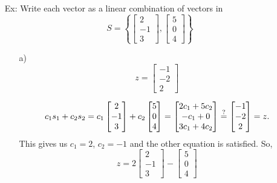 \documentclass[reqno]{amsart}
\theoremstyle{definition}
\begin{document}
\begin{enumerate}

\item[Ex:  ]  Write each vector as a linear combination of vectors in
%
\begin{equation*}
S = \left\lbrace\begin{bmatrix}
2\\
-1\\
3
\end{bmatrix}, \begin{bmatrix}
5\\
0\\
4
\end{bmatrix}\right\rbrace
\end{equation*}

\begin{enumerate}

\item[a)]
%
\begin{equation*}
z = \begin{bmatrix}
-1\\
-2\\
2
\end{bmatrix}
\end{equation*}

\begin{equation*}
c_1s_1 + c_2s_2 = 
c_1\begin{bmatrix}
2\\
-1\\
3
\end{bmatrix} + c_2\begin{bmatrix}
5\\
0\\
4
\end{bmatrix} = \begin{bmatrix}
2c_1 + 5c_2\\
-c_1 + 0\\
3c_1 + 4c_2
\end{bmatrix} \stackrel{?}{=} \begin{bmatrix}
-1\\
-2\\
2
\end{bmatrix} = z.
\end{equation*}
%
This gives us $c_1 = 2$, $c_2 = -1$ and the other equation is satisfied.  So,
%
\begin{equation*}
z = 2\begin{bmatrix}
2\\
-1\\
3
\end{bmatrix} - \begin{bmatrix}
5\\
0\\
4
\end{bmatrix}
\end{equation*}


\end{enumerate}
\end{enumerate}
\end{document}
